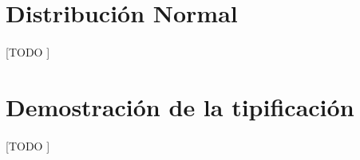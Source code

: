 \documentclass{article}
\begin{document}
	\maketitle
  \thispagestyle{empty}


  \section{Distribución Normal}
  \label{sec:description}

    \paragraph{}
    [TODO ]

  \section{Demostración de la tipificación}
  \label{sec:demostration}

    \paragraph{}
    [TODO ]

	\nocite{prob2017}

  
  
\end{document}
